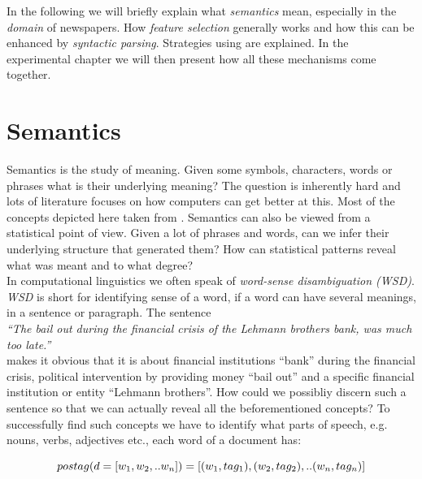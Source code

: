In the following we will briefly explain what \emph{semantics} mean, especially in the \emph{domain} of newspapers. How \emph{feature selection} generally works and how this can be enhanced by \emph{syntactic parsing}. Strategies using \wordwiki{} are explained. In the experimental chapter we will then present how all these mechanisms come together.


\section{Semantics}
\label{sec:semantics}
  
  Semantics is the study of meaning. Given some symbols, characters, words or phrases what is their underlying meaning? The question is inherently hard and lots of literature focuses on how computers can get better at this. Most of the concepts depicted here taken from \cite{NLPBookJurafsky2000}. Semantics can also be viewed from a statistical point of view. Given a lot of phrases and words, can we infer their underlying structure that generated them? How can statistical patterns reveal what was meant and to what degree?\\
  In computational linguistics we often speak of \emph{word-sense disambiguation (WSD)}. \emph{WSD} is short for identifying sense of a word, if a word can have several meanings, in a sentence or paragraph. The sentence\\ 

    \emph{``The bail out during the financial crisis of the Lehmann brothers bank, was much too late.''}\\

  makes it obvious that it is about financial institutions ``bank'' during the financial crisis, political intervention by providing money ``bail out'' and a specific financial institution or entity ``Lehmann brothers''. How could we possibliy discern such a sentence so that we can actually reveal all the beforementioned concepts? To successfully find such concepts we have to identify what parts of speech, e.g. nouns, verbs, adjectives etc., each word of a document has:

    \begin{equation}
      pos\-tag(d=[w_1,w_2,..w_n]) = [(w_1, tag_1), (w_2, tag_2),.. (w_n, tag_n)]
    \end{equation}

